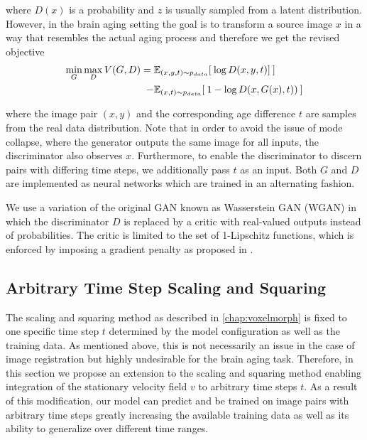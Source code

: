 where $D(x)$ is a probability and $z$ is usually sampled from a latent distribution. However, in the brain aging setting the goal is to transform a source image $x$ in a way that resembles the actual aging process and therefore we get the revised objective
\begin{equation}
	\begin{split}
		\min_G \max_D V(G, D) = \; & \mathbb{E}_{ (x, y, t) \sim p_{data} } [ \: \log{D (x, y, t)}] \: ] \\
		 - & \mathbb{E}_{ (x, t) \sim p_{data} } [ \: 1 - \log{D (x, G(x), t)}) \: ]
	\end{split}
\end{equation}

where the image pair $(x, y)$ and the corresponding age difference $t$ are samples from the real data distribution. Note that in order to avoid the issue of mode collapse, where the generator outputs the same image for all inputs, the discriminator also observes $x$. Furthermore, to enable the discriminator to discern pairs with differing time steps, we additionally pass $t$ as an input. Both $G$ and $D$ are implemented as neural networks which are trained in an alternating fashion. 

We use a variation of the original GAN known as Wasserstein GAN (WGAN) \cite{arjovsky2017wasserstein} in which the discriminator $D$ is replaced by a critic with real-valued outputs instead of probabilities. The critic is limited to the set of 1-Lipschitz functions, which is enforced by imposing a gradient penalty as proposed in \cite{gulrajani2017improved}.

\subsection{Arbitrary Time Step Scaling and Squaring}
\label{sec:adaarbtimestep}
The scaling and squaring method as described in \autoref{chap:voxelmorph} is fixed to one specific time step $t$ determined by the model configuration as well as the training data. As mentioned above, this is not necessarily an issue in the case of image registration but highly undesirable for the brain aging task. Therefore, in this section we propose an extension to the scaling and squaring method enabling integration of the stationary velocity field $v$ to arbitrary time steps $t$. As a result of this modification, our model can predict and be trained on image pairs with arbitrary time steps greatly increasing the available training data as well as its ability to generalize over different time ranges.


